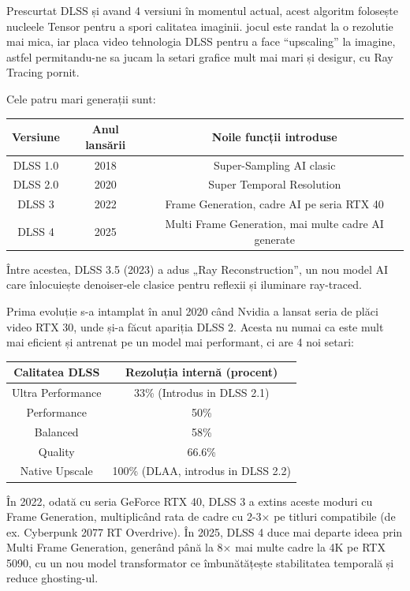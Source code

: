 Prescurtat DLSS și avand 4 versiuni în momentul actual, acest algoritm folosește nucleele Tensor pentru a spori calitatea imaginii. jocul este randat la o rezolutie mai mica, iar placa video tehnologia DLSS pentru a face “upscaling” la imagine, astfel permitandu-ne sa jucam la setari grafice mult mai mari și desigur, cu Ray Tracing pornit.

Cele patru mari generații sunt: 

\begin{center}
\begin{tabular}{||c c c||} 
 \hline
 Versiune & Anul lansării & Noile funcții introduse \\ [0.5ex] 
 \hline\hline
 DLSS 1.0 & 2018 & Super-Sampling AI clasic \\ 
 \hline
 DLSS 2.0 & 2020 & Super Temporal Resolution \\
 \hline
 DLSS 3 & 2022 & Frame Generation, cadre AI pe seria RTX 40 \\
 \hline
 DLSS 4 & 2025 & Multi Frame Generation, mai multe cadre AI generate \\ [1ex] 
 \hline
\end{tabular}
\end{center}

\noindent Între acestea, DLSS 3.5 (2023) a adus „Ray Reconstruction”, un nou model AI care înlocuiește denoiser-ele clasice pentru reflexii și iluminare ray-traced. 

Prima evoluție s-a intamplat în anul 2020 când Nvidia a lansat seria de plăci video RTX 30, unde și-a făcut apariția DLSS 2. Acesta nu numai ca este mult mai eficient și antrenat pe un model mai performant, ci are 4 noi setari: 

\begin{center}
\begin{tabular}{||c c||} 
 \hline
 Calitatea DLSS & Rezoluția internă (procent) \\ [0.5ex] 
 \hline\hline
 Ultra Performance & 33\% (Introdus in DLSS 2.1) \\ 
 \hline
 Performance & 50\%  \\
 \hline
 Balanced & 58\% \\
 \hline
 Quality & 66.6\%  \\ [1ex] 
 \hline
 Native Upscale & 100\% (DLAA, introdus in DLSS 2.2)  \\ [1ex] 
 \hline
\end{tabular}
\end{center}


 În 2022, odată cu seria GeForce RTX 40, DLSS 3 a extins aceste moduri cu Frame Generation, multiplicând rata de cadre cu 2-3× pe titluri compatibile (de ex. Cyberpunk 2077 RT Overdrive). În 2025, DLSS 4 duce mai departe ideea prin Multi Frame Generation, generând până la 8× mai multe cadre la 4K pe RTX 5090, cu un nou model transformator ce îmbunătățește stabilitatea temporală și reduce ghosting-ul. 

